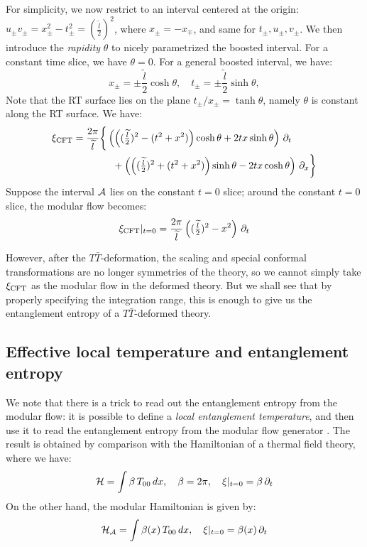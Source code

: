 \documentclass[11pt,a4paper,utf8]{article}
\newcommand{\TTbar}{\ensuremath{T\bar{T}}\xspace}
\renewcommand{\tilde}[1]{\ensuremath{\widetilde{#1}}}
\begin{document}
	For simplicity, we now restrict to an interval centered at the origin: $
		u_\pm v_\pm
		= x^2_\pm - t^2_\pm
		= (\frac{\tilde{l}}{2})^2
	$, where $x_\pm = -x_\mp$, and same for $t_\pm, u_\pm, v_\pm$. 
	We then introduce the \textit{rapidity} $\theta$ to nicely parametrized the boosted interval. For a constant time slice, we have $\theta = 0$. For a general boosted interval, we have:
	\begin{equation}
		x_\pm = \pm \frac{\tilde{l}}{2} \cosh \theta,
	\quad
		t_\pm = \pm \frac{\tilde{l}}{2} \sinh \theta,
	\end{equation}
	Note that the RT surface lies on the plane $
		t_\pm / x_\pm = \tanh \theta
	$, namely $\theta$ is constant along the RT surface. 
	We have:
	\begin{gather}
	\begin{aligned}
		\xi_\mrm{CFT} &= \frac{2\pi}{\tilde{l}} \bigg\{
			\pqty{
				\pqty{
					(\tfrac{\tilde{l}}{2})^2
					- (t^2 + x^2)
				} \cosh\theta
				+ 2tx \sinh\theta
			} \,\pdd{t}
		\\ &\qquad\qquad 
			+ \pqty{
				\pqty{
					(\tfrac{\tilde{l}}{2})^2
					+ (t^2 + x^2)
				} \sinh\theta
				- 2tx \cosh\theta
			} \,\pdd{x}
		\bigg\}
	\end{aligned}
	\end{gather}
	Suppose the interval $\mathcal{A}$ lies on the constant $t = 0$ slice; around the constant $t = 0$ slice, the modular flow becomes:
	\begin{equation}
		\xi_\mrm{CFT}|_{t = 0} 
		= \frac{2\pi}{\tilde{l}}
			\pqty{
				(\tfrac{\tilde{l}}{2})^2
				- x^2
			} \,\pdd{t}
	\end{equation}
	
	However, after the \TTbar-deformation, the scaling and special conformal transformations are no longer symmetries of the theory, so we cannot simply take $\xi_{\mathrm{CFT}}$ as the modular flow in the deformed theory. 
	But we shall see that by properly specifying the integration range, this is enough to give us the entanglement entropy of a \TTbar-deformed theory. 

\subsection{Effective local temperature and entanglement entropy}
	
	We note that there is a trick to read out the entanglement entropy from the modular flow: it is possible to define a \textit{local entanglement temperature}, and then use it to read the entanglement entropy from the modular flow generator \cite{Wong:2013gua,Cardy:2016fqc}. The result is obtained by comparison with the Hamiltonian of a thermal field theory, where we have:
	\begin{equation}
	\mathcal{H}=\int \beta\,T_{00}\,dx,\quad \beta = 2\pi,
	\quad \xi|_{t=0} = \beta\,\partial_{t}
	\label{eq:beta_thermal}
	\end{equation}
	On the other hand, the modular Hamiltonian is given by:
	\begin{equation}
	\mathcal{H}_{\mathcal{A}}=\int \beta(x)\, T_{00}\,dx,\quad \xi|_{t=0} = \beta(x)\, \partial_{t}
	\end{equation}
	
\end{document}
